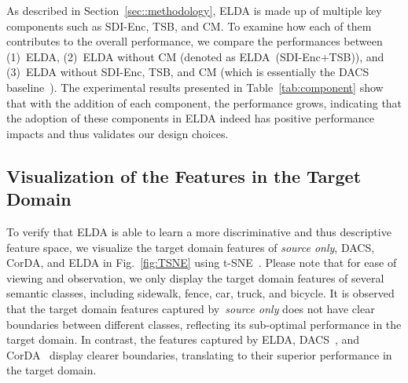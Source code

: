 \documentclass{bmvc2k}
\begin{document}
\begin{table*}[t]
\centering
\setlength{\tabcolsep}{1em}
\caption{An ablation analysis for validating the effectiveness of each component.}
\label{tab:component}
\end{table*} 
As described in Section~\ref{sec::methodology}, ELDA is made up of multiple key components such as SDI-Enc, TSB, and CM. To examine how each of them contributes to the overall performance, we compare the performances between (1)~ELDA, (2)~ELDA without CM (denoted as ELDA~(SDI-Enc+TSB)), and (3)~ELDA without SDI-Enc, TSB, and CM (which is essentially the DACS baseline~\cite{tranheden2020dacs}). 
The experimental results presented in Table~\ref{tab:component} show that with the addition of each component, the performance grows, indicating that the adoption of these components in ELDA indeed has positive performance impacts and thus validates our design choices. 

\subsection{Visualization of the Features in the Target Domain}
\label{subsec::visualization}

To verify that ELDA is able to learn a more discriminative and thus descriptive feature space, we visualize the target domain features of \textit{source only}, DACS, CorDA, and ELDA in Fig.~\ref{fig:TSNE} using t-SNE~\cite{vanDerMaaten2008}. Please note that for  ease of viewing and observation, we only display the target domain features of several semantic classes, including sidewalk, fence, car, truck, and bicycle. It is observed that the target domain features captured by~\textit{source only} does not have clear boundaries between different classes, reflecting its sub-optimal performance in the target domain. 
In contrast, the features captured by ELDA, DACS~\cite{tranheden2020dacs}, and CorDA~\cite{wang2021domain} display 
clearer boundaries, translating to their superior performance in the target domain.
\end{document}
